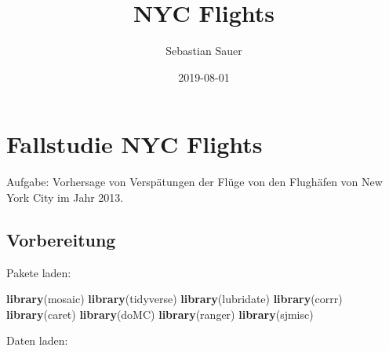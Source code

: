 \documentclass[]{article}
\title{NYC Flights}
\author{Sebastian Sauer}
\date{2019-08-01}
\newenvironment{Shaded}{\begin{snugshade}}{\end{snugshade}}
\newcommand{\KeywordTok}[1]{\textcolor[rgb]{0.13,0.29,0.53}{\textbf{#1}}}
\newcommand{\NormalTok}[1]{#1}
\begin{document}
\maketitle

{
\setcounter{tocdepth}{2}
\tableofcontents
}
\hypertarget{fallstudie-nyc-flights}{%
\section{Fallstudie NYC Flights}\label{fallstudie-nyc-flights}}

Aufgabe: Vorhersage von Verspätungen der Flüge von den Flughäfen von New
York City im Jahr 2013.

\hypertarget{vorbereitung}{%
\subsection{Vorbereitung}\label{vorbereitung}}

Pakete laden:

\begin{Shaded}
\begin{Highlighting}[]
\KeywordTok{library}\NormalTok{(mosaic)}
\KeywordTok{library}\NormalTok{(tidyverse)}
\KeywordTok{library}\NormalTok{(lubridate)}
\KeywordTok{library}\NormalTok{(corrr)}
\KeywordTok{library}\NormalTok{(caret)}
\KeywordTok{library}\NormalTok{(doMC)}
\KeywordTok{library}\NormalTok{(ranger)}
\KeywordTok{library}\NormalTok{(sjmisc)}
\end{Highlighting}
\end{Shaded}

Daten laden:
\end{document}
